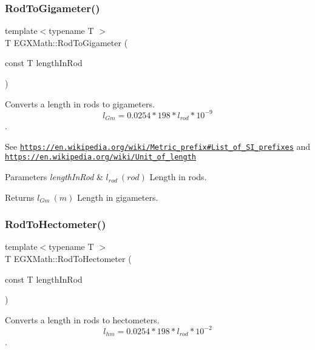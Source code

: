 \subsubsection{\texorpdfstring{Rod\+To\+Gigameter()}{RodToGigameter()}}
{\footnotesize\ttfamily template$<$typename T $>$ \\
T E\+G\+X\+Math\+::\+Rod\+To\+Gigameter (\begin{DoxyParamCaption}\item[{const T}]{length\+In\+Rod }\end{DoxyParamCaption})}



Converts a length in rods to gigameters. \[ l_{Gm}=0.0254 * 198 * l_{rod} * 10^{-9} \]. 

See \href{https://en.wikipedia.org/wiki/Metric_prefix#List_of_SI_prefixes}{\tt https\+://en.\+wikipedia.\+org/wiki/\+Metric\+\_\+prefix\#\+List\+\_\+of\+\_\+\+S\+I\+\_\+prefixes} and \href{https://en.wikipedia.org/wiki/Unit_of_length}{\tt https\+://en.\+wikipedia.\+org/wiki/\+Unit\+\_\+of\+\_\+length} 
\begin{DoxyParams}{Parameters}
{\em length\+In\+Rod} & $ l_{rod}\ (rod)$ Length in rods. \\
\hline
\end{DoxyParams}
\begin{DoxyReturn}{Returns}
$ l_{Gm}\ (m)$ Length in gigameters. 
\end{DoxyReturn}
\mbox{\label{group___e_g_x_math-_conversions-_length_conversions-_surveyors-_rod-_s_i_ga9a5cefa380459848ac99b3f9784817ce}} 
\subsubsection{\texorpdfstring{Rod\+To\+Hectometer()}{RodToHectometer()}}
{\footnotesize\ttfamily template$<$typename T $>$ \\
T E\+G\+X\+Math\+::\+Rod\+To\+Hectometer (\begin{DoxyParamCaption}\item[{const T}]{length\+In\+Rod }\end{DoxyParamCaption})}



Converts a length in rods to hectometers. \[ l_{hm}=0.0254 * 198 * l_{rod} * 10^{-2} \]. 

